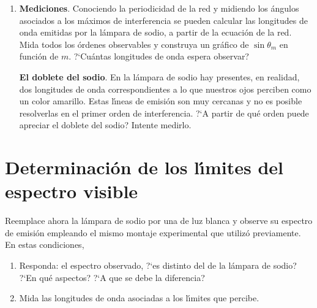 \documentclass[laboratorio]{guia}
\begin{document}
\begin{enumerate}
        Para asegurarse incidencia normal se ubica el anteojo enfrentando al 
        colimador y se lee la posici\'on angular ($L_0$). A continuaci\'on, 
        se buscan los m\'aximos correspondientes al mayor orden de 
        interferencia visible; primero hacia un lado y luego hacia el otro,
        registrando los \'angulos correspondientes. Si la desviaci\'on respecto
        de $L_0$ correspondiente a un mismo orden de interferencia, es 
        id\'entica hacia ambos lados se puede considerar que la red est\'a 
        ubicada en forma perpendicular al haz incidente. (Justifique por qu\'e
        esta afirmaci\'on es v\'alida). Si observa que la red no est\'a 
        centrada, gire la platina levemente y determine nuevamente la 
        desviaci\'on de los m\'aximos hacia ambos lados hasta que sus 
        observaciones coincidan.

    \item {\bf Mediciones}. Conociendo la periodicidad de la red y midiendo los
        \'angulos asociados a los  m\'aximos de interferencia se pueden 
        calcular las longitudes de onda emitidas por la l\'ampara de sodio, a
        partir de la ecuaci\'on de la red. Mida todos los \'ordenes observables
        y construya un gr\'afico de $\sin \theta_m$ en funci\'on de $m$. 
        ?`Cu\'antas longitudes de onda espera observar?
        
        {\bf El doblete del sodio}. En la l\'ampara de sodio hay presentes,
        en realidad, dos longitudes 
        de onda correspondientes a lo que nuestros ojos perciben como un 
        color amarillo. Estas l\'\i neas de emisi\'on son muy cercanas y no es
        posible resolverlas en el primer orden de interferencia. 
        ?`A partir de qu\'e orden puede apreciar el doblete del sodio? 
        Intente medirlo.
\end{enumerate}

\section{Determinaci\'on de los l\'\i mites del espectro visible}

Reemplace ahora la l\'ampara de sodio por una de luz blanca y observe su  
espectro de emisi\'on empleando el mismo montaje experimental que utiliz\'o 
previamente. En estas condiciones, 

\begin{enumerate}
    \item Responda: el espectro observado, ?`es distinto del de la l\'ampara 
        de sodio? ?`En qu\'e aspectos? ?`A que se debe la diferencia? 
    \item Mida las longitudes de onda asociadas a los l\'\i mites que percibe.
\end{enumerate}
\end{document}
